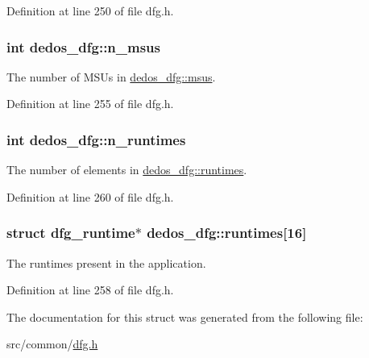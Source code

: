 Definition at line 250 of file dfg.\-h.

\hypertarget{structdedos__dfg_ad2f0a4385c8adcb46e74c872fdbed428}{
\subsubsection[{n\-\_\-msus}]{\setlength{\rightskip}{0pt plus 5cm}int dedos\-\_\-dfg\-::n\-\_\-msus}}\label{structdedos__dfg_ad2f0a4385c8adcb46e74c872fdbed428}


The number of M\-S\-Us in \hyperlink{structdedos__dfg_a5177dba1dea7f8f2fb383c5839c5f5f7}{dedos\-\_\-dfg\-::msus}. 



Definition at line 255 of file dfg.\-h.

\hypertarget{structdedos__dfg_ad222786891e1415cff70c46f083992df}{
\subsubsection[{n\-\_\-runtimes}]{\setlength{\rightskip}{0pt plus 5cm}int dedos\-\_\-dfg\-::n\-\_\-runtimes}}\label{structdedos__dfg_ad222786891e1415cff70c46f083992df}


The number of elements in \hyperlink{structdedos__dfg_a90ca69ed86b7f3d3286e4cdd4ddcae7f}{dedos\-\_\-dfg\-::runtimes}. 



Definition at line 260 of file dfg.\-h.

\hypertarget{structdedos__dfg_a90ca69ed86b7f3d3286e4cdd4ddcae7f}{
\subsubsection[{runtimes}]{\setlength{\rightskip}{0pt plus 5cm}struct {\bf dfg\-\_\-runtime}$\ast$ dedos\-\_\-dfg\-::runtimes\mbox{[}16\mbox{]}}}\label{structdedos__dfg_a90ca69ed86b7f3d3286e4cdd4ddcae7f}


The runtimes present in the application. 



Definition at line 258 of file dfg.\-h.



The documentation for this struct was generated from the following file\-:\begin{DoxyCompactItemize}
\item 
src/common/\hyperlink{dfg_8h}{dfg.\-h}\end{DoxyCompactItemize}
